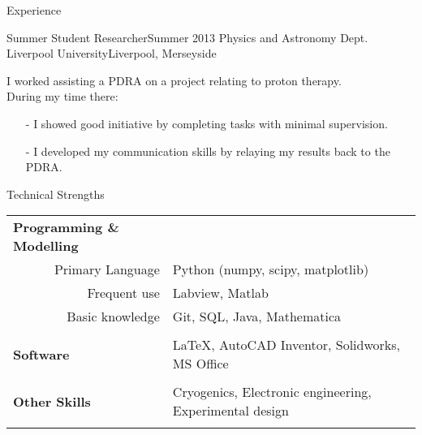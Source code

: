 \documentclass{resume} %
\begin{document}
\begin{rSection}{Experience}
\begin{rSubsection}{Summer Student Researcher}{Summer 2013}
{Physics and Astronomy Dept. Liverpool University}{Liverpool, Merseyside}
{\small
\item[] I worked assisting a PDRA on a project relating to proton therapy.\\
During my time there:
\begin{itemize}
\item[-] I showed good initiative by completing tasks with minimal supervision.
\item[-] I developed my communication skills by relaying my results back to the PDRA.
\end{itemize}
}
\end{rSubsection}

\end{rSection}

\begin{rSection}{Technical Strengths}

\begin{tabular}{ll}
	\multicolumn{1}{l|}{{\bf Programming \& Modelling}} &  \\
	\multicolumn{1}{r|}{Primary Language} & Python (numpy, scipy, matplotlib)\\
	\multicolumn{1}{r|}{Frequent use} & Labview, Matlab\\
	\multicolumn{1}{r|}{Basic knowledge} & Git, SQL, Java, Mathematica\\
	& \\

	\multicolumn{1}{l|}{{\bf Software}} & {\LaTeX, AutoCAD Inventor, Solidworks, MS Office}\\
	& \\
	
	\multicolumn{1}{l|}{{\bf Other Skills}} & {Cryogenics, Electronic engineering, Experimental design}\\
	& \\
	
\end{tabular}

\end{rSection}

\end{document}

